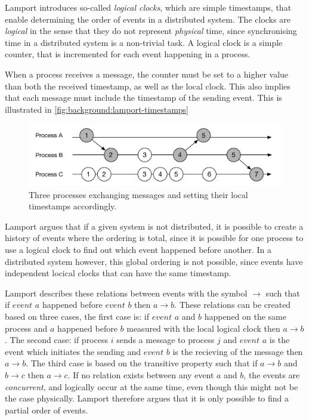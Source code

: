 		\newpar Lamport introduces so-called \textit{logical clocks}, which are simple timestamps, that enable determining the order of events in a distributed system. The clocks are \textit{logical} in the sense that they do not represent \textit{physical} time, since synchronising time in a distributed system is a non-trivial task. A logical clock is a simple counter, that is incremented for each event happening in a process. 
		
		When a process receives a message, the counter must be set to a higher value than both the received timestamp, as well as the local clock. This also implies that each message must include the timestamp of the sending event. This is illustrated in \autoref{fig:background:lamport-timestamps}
		
		\begin{figure}[H]
		\centering
		\includegraphics[width=\textwidth]{2background/images/lamport-timestamps.pdf}
		\caption{Three processes exchanging messages and setting their local timestamps accordingly.}
		\label{fig:background:lamport-timestamps}
		\end{figure}
		
		\newpar Lamport argues that if a given system is not distributed, it is possible to create a history of events where the ordering is total, since it is possible for one process to use a logical clock to find out which event happened before another. In a distributed system however, this global ordering is not possible, since events have independent locical clocks that can have the same timestamp.
		
		\newpar Lamport describes these relations between events with the symbol $\rightarrow$ such that if $event$ $a$ happened before $event$ $b$ then $a \rightarrow b$. These relations can be created based on three cases, the first case is: if $event$ $a$ and $b$ happened on the same process and $a$ happened before $b$ measured with the local logical clock then $a \rightarrow b$. The second case: if process $i$ sends a message to process $j$ and $event$ $a$ is the event which initiates the sending and $event$ $b$ is the recieving of the message then $a \rightarrow b$. The third case is based on the transitive property such that if $a \rightarrow b$ and $b \rightarrow c$ then $a \rightarrow c$. If no relation exists between any event $a$ and $b$, the events are \textit{concurrent}, and logically occur at the same time, even though this might not be the case physically. Lamport therefore argues that it is only possible to find a partial order of events.
		
